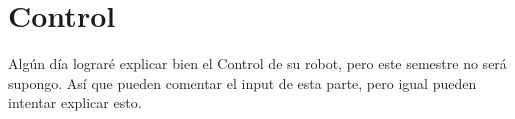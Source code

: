 \section{Control} \label{sec:control}
Algún día lograré explicar bien el Control de su robot, pero este semestre no será supongo. Así que pueden comentar el input de esta parte, pero igual pueden intentar explicar esto.

